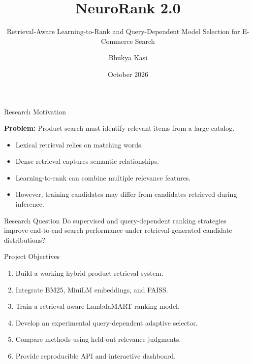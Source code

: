 \documentclass[aspectratio=169,11pt]{beamer}
\title[NeuroRank 2.0]{
NeuroRank 2.0
}
\subtitle{
Retrieval-Aware Learning-to-Rank
and Query-Dependent Model Selection
for E-Commerce Search
}
\author{Bhukya Kasi}
\institute{
Indian Institute of Technology Dharwad
}
\date{October 2026}
\begin{document}
\begin{frame}
\titlepage
\end{frame}

\begin{frame}{Research Motivation}

\textbf{Problem:}
Product search must identify relevant
items from a large catalog.

\vspace{0.4cm}

\begin{itemize}
\item Lexical retrieval relies on
matching words.

\item Dense retrieval captures
semantic relationships.

\item Learning-to-rank can combine
multiple relevance features.

\item However, training candidates
may differ from candidates retrieved
during inference.
\end{itemize}

\vspace{0.3cm}

\begin{block}{Research Question}
Do supervised and query-dependent
ranking strategies improve
end-to-end search performance
under retrieval-generated
candidate distributions?
\end{block}

\end{frame}

\begin{frame}{Project Objectives}

\begin{enumerate}
\item Build a working hybrid product
retrieval system.

\item Integrate BM25, MiniLM
embeddings, and FAISS.

\item Train a retrieval-aware
LambdaMART ranking model.

\item Develop an experimental
query-dependent adaptive selector.

\item Compare methods using
held-out relevance judgments.

\item Provide reproducible API
and interactive dashboard.
\end{enumerate}

\end{frame}
\end{document}
